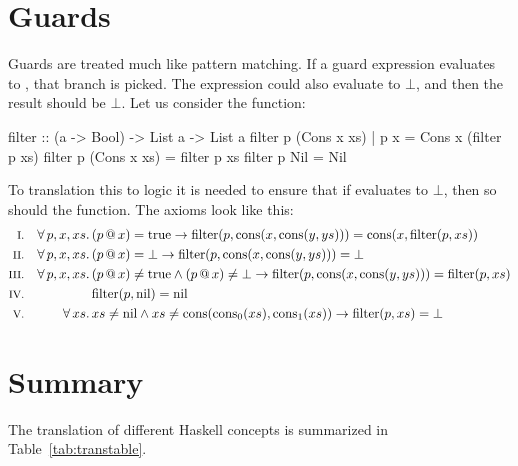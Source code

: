 \section{Guards}

Guards are treated much like pattern matching. If a
guard expression evaluates to , that branch is picked. The
expression could also evaluate to $\bot$, and then the result should
be $\bot$. Let us consider the  function:

\begin{code}
filter :: (a -> Bool) -> List a -> List a
filter p (Cons x xs) | p x = Cons x (filter p xs)
filter p (Cons x xs)       = filter p xs
filter p Nil               = Nil
\end{code}


To translation this to logic it is needed to ensure that if 
evaluates to $\bot$, then so should the function. The axioms look
like this:
\newcommand\filter[2]{\fn{filter}(#1,#2)}
\begin{align*}
\rom{1} && \faaa{p}{x}{xs} & (\app{p}{x}) = \fn{true}                                  \rightarrow \filter{p}{\cons{x}{\cons{y}{ys}}} = \cons{x}{\filter{p}{xs}} \\
\rom{2} && \faaa{p}{x}{xs} & (\app{p}{x}) = \bot                                       \rightarrow \filter{p}{\cons{x}{\cons{y}{ys}}} = \bot \\
\rom{3} && \faaa{p}{x}{xs} & (\app{p}{x}) \neq \fn{true} \wedge (\app{p}{x}) \neq \bot \rightarrow \filter{p}{\cons{x}{\cons{y}{ys}}} = \filter{p}{xs} \\
\rom{4} &&                 & \filter{p}{\fn{nil}} = \fn{nil} \\
\rom{5} && \fa{xs}         & xs \neq \fn{nil} \wedge xs \neq \uncons{xs} \rightarrow \filter{p}{xs} = \bot
\end{align*}

\section{Summary}

The translation of different Haskell concepts is summarized in
Table~\ref{tab:transtable}.

